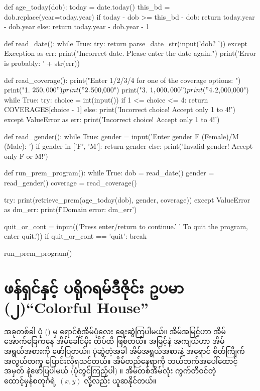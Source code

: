 \begin{py}
def age_today(dob):
    today = date.today()
    this_bd = dob.replace(year=today.year)
    if today - dob >= this_bd - dob:
        return today.year - dob.year
    else:
        return today.year - dob.year - 1


def read_date():
    while True:
        try:
            return parse_date_str(input('dob? '))
        except Exception as err:
            print("Incorrect date. Please enter the date again.")
            print('Error is probably: ' + str(err))


def read_coverage():
    print("Enter 1/2/3/4 for one of the coverage options: ")
    print("1. $250,000")
    print("2. $500,000")
    print("3. $1,000,000")
    print("4. $2,000,000")
    while True:
        try:
            choice = int(input())
            if 1 <= choice <= 4:
                return COVERAGES[choice - 1]
            else:
                print('Incorrect choice! Accept only 1 to 4!')
        except ValueError as err:
            print('Incorrect choice! Accept only 1 to 4!')


def read_gender():
    while True:
        gender = input('Enter gender F (Female)/M (Male): ')
        if gender in ['F', 'M']:
            return gender
        else:
            print('Invalid gender! Accept only F or M!')


def run_prem_program():
    while True:
        dob = read_date()
        gender = read_gender()
        coverage = read_coverage()

        try:
            print(retrieve_prem(age_today(dob),
                                gender,
                                coverage))
        except ValueError as dm_err:
            print(f'Domain error: {dm_err}')

        quit_or_cont = input(('Press enter/return to continue.'
                              ' To quit the program, enter quit.'))
        if quit_or_cont == 'quit':
            break


run_prem_program()

\end{py}
%

\section{ဖန်ရှင်နှင့် ပရိုဂရမ်ဒီဇိုင်း ဥပမာ (၂)\qquad“Colorful House”}

အခုတစ်ခါ ပုံ (\fRefNo{\ref{fig:colorful_house}}) မှ ရောင်စုံအိမ်ပုံလေး ရေးဆွဲကြပါမယ်။ အိမ်အမြင့်ဟာ အိမ်အောက်ခြေကနေ အိမ်ခေါင်မိုး ထိပ်ထိ ဖြစ်တယ်။ အမြင့်နဲ့ အကျယ်ဟာ အိမ်အရွယ်အစားကို ဖော်ပြတယ်။ ပုံဆွဲတဲ့အခါ အိမ်အရွယ်အစားနဲ့ အရောင် စိတ်ကြိုက် အလွယ်တကူ ပြောင်းလို့ရသင့်တယ်။ အိမ်တည်နေရာကို ဘယ်ဘက်အပေါ်ထောင့်အမှတ် နဲ့ဖော်ပြပါမယ် (ပုံတွင်ကြည့်ပါ) ။ အိမ်တစ်အိမ်လုံး ကွက်\allowbreak တိဝင်တဲ့ ထောင့်မှန်စတုဂံရဲ့ $(x, y)$ လို့လည်း ယူဆနိုင်တယ်။ 

